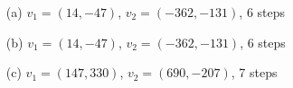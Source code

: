 \begin{exer}[7.45]
	\begin{algorithm}
	\end{algorithm}
	\begin{enumerate}
		\item [(a)] $v_1 = (14, -47)$, $v_2 = (-362, -131)$, 6 steps
		\item [(b)] $v_1 = (14, -47)$, $v_2 = (-362, -131)$, 6 steps
		\item [(c)] $v_1 = (147, 330)$, $v_2 = (690, -207)$, 7 steps
	\end{enumerate}
\end{exer}

